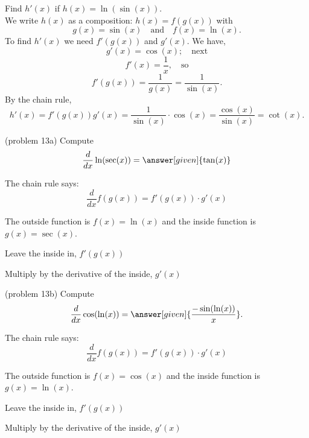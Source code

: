 \documentclass{ximera}
\begin{document}
\begin{example}[example 13]
Find $h'(x)$ if $h(x) = \ln(\sin(x))$.\\
We write $h(x)$ as a composition: $h(x)=f(g(x))$ with 
\[g(x) = \sin(x)  \quad \text{and} \quad  f(x) = \ln(x).\]
 To find $h'(x)$ we need $f'(g(x))$ and $g'(x)$.  We have,
\[g'(x) = \cos(x); \quad \text{next} \]
\[f'(x) = \frac{1}{x}, \quad \text{so}\]
\[f'(g(x)) = \frac{1}{g(x)} = \frac{1}{\sin(x)}.\]
By the chain rule,
\[h'(x) = f'(g(x))g'(x) = \frac{1}{\sin(x)} \cdot \cos(x) = \frac{\cos(x)}{\sin(x)} = \cot(x).\]
\end{example}

\begin{center}
\begin{foldable}
\end{foldable}
\end{center}


\begin{problem}(problem 13a)
  Compute
  \[
  \frac{d}{dx} \ln(\sec(x)) = \answer[given]{\tan(x)}
  \]
  
    \begin{hint}
      The chain rule says:
      \[
      \frac{d}{dx} f(g(x)) = f'(g(x))\cdot g'(x)
      \]
    \end{hint}
    \begin{hint}
      The outside function is $f(x) = \ln(x)$ and the inside
      function is $g(x) = \sec(x)$.
    \end{hint}
    \begin{hint}
		  Leave the inside in, $f'(g(x))$
		\end{hint}
		\begin{hint}
		  Multiply by the derivative of the inside, $g'(x)$
		\end{hint}
    
	
\end{problem}

\begin{problem}(problem 13b)
  Compute
  \[
  \frac{d}{dx} \cos(\ln(x)) = \answer[given]{\frac{-\sin(\ln(x))}{x}}.
  \]
  
    \begin{hint}
      The chain rule says:
      \[
      \frac{d}{dx} f(g(x)) = f'(g(x))\cdot g'(x)
      \]
    \end{hint}
    \begin{hint}
      The outside function is $f(x) = \cos(x)$ and the inside
      function is $g(x) = \ln(x)$.
    \end{hint}
    \begin{hint}
		  Leave the inside in, $f'(g(x))$
		\end{hint}
		\begin{hint}
		  Multiply by the derivative of the inside, $g'(x)$
		\end{hint}
    
		
\end{problem}
\end{document}
